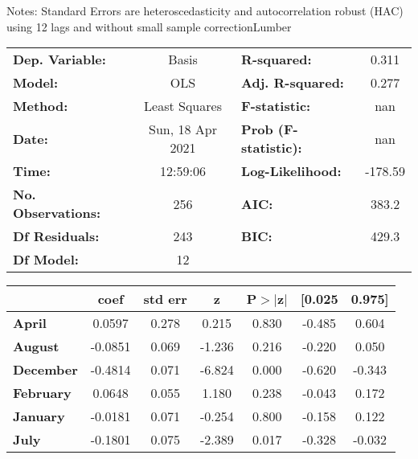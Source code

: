 Notes: \newline
 [1] Standard Errors are heteroscedasticity and autocorrelation robust (HAC) using 12 lags and without small sample correctionLumber\begin{center}
\begin{tabular}{lclc}
\toprule
\textbf{Dep. Variable:}    &      Basis       & \textbf{  R-squared:         } &     0.311   \\
\textbf{Model:}            &       OLS        & \textbf{  Adj. R-squared:    } &     0.277   \\
\textbf{Method:}           &  Least Squares   & \textbf{  F-statistic:       } &       nan   \\
\textbf{Date:}             & Sun, 18 Apr 2021 & \textbf{  Prob (F-statistic):} &      nan    \\
\textbf{Time:}             &     12:59:06     & \textbf{  Log-Likelihood:    } &   -178.59   \\
\textbf{No. Observations:} &         256      & \textbf{  AIC:               } &     383.2   \\
\textbf{Df Residuals:}     &         243      & \textbf{  BIC:               } &     429.3   \\
\textbf{Df Model:}         &          12      & \textbf{                     } &             \\
\bottomrule
\end{tabular}
\begin{tabular}{lcccccc}
                   & \textbf{coef} & \textbf{std err} & \textbf{z} & \textbf{P$> |$z$|$} & \textbf{[0.025} & \textbf{0.975]}  \\
\midrule
\textbf{April}     &       0.0597  &        0.278     &     0.215  &         0.830        &       -0.485    &        0.604     \\
\textbf{August}    &      -0.0851  &        0.069     &    -1.236  &         0.216        &       -0.220    &        0.050     \\
\textbf{December}  &      -0.4814  &        0.071     &    -6.824  &         0.000        &       -0.620    &       -0.343     \\
\textbf{February}  &       0.0648  &        0.055     &     1.180  &         0.238        &       -0.043    &        0.172     \\
\textbf{January}   &      -0.0181  &        0.071     &    -0.254  &         0.800        &       -0.158    &        0.122     \\
\textbf{July}      &      -0.1801  &        0.075     &    -2.389  &         0.017        &       -0.328    &       -0.032     \\

\end{tabular}
\end{center}
